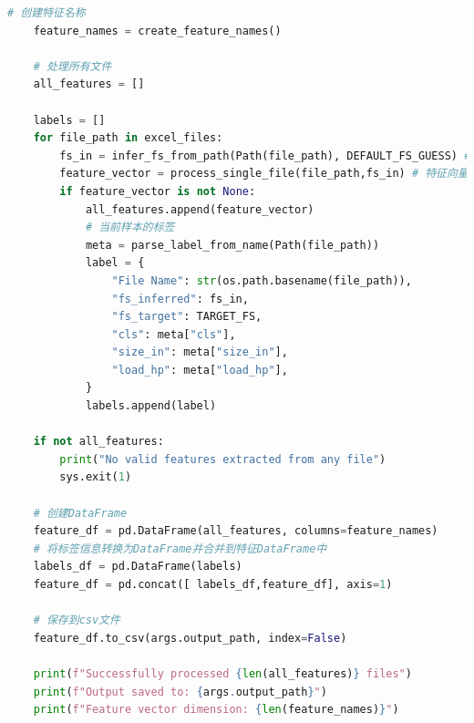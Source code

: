 \documentclass[a4paper]{CPIPC}
\numberwithin{equation}{section}
\begin{document}
\begin{lstlisting}[language=Python, caption=Feature Extraction]
    # 创建特征名称
    feature_names = create_feature_names()
    
    # 处理所有文件
    all_features = []

    labels = []
    for file_path in excel_files:
        fs_in = infer_fs_from_path(Path(file_path), DEFAULT_FS_GUESS) # 输入频率
        feature_vector = process_single_file(file_path,fs_in) # 特征向量
        if feature_vector is not None:
            all_features.append(feature_vector)
            # 当前样本的标签
            meta = parse_label_from_name(Path(file_path))
            label = {
                "File Name": str(os.path.basename(file_path)),
                "fs_inferred": fs_in,
                "fs_target": TARGET_FS,
                "cls": meta["cls"],
                "size_in": meta["size_in"],
                "load_hp": meta["load_hp"],
            }
            labels.append(label)
    
    if not all_features:
        print("No valid features extracted from any file")
        sys.exit(1)
    
    # 创建DataFrame
    feature_df = pd.DataFrame(all_features, columns=feature_names)
    # 将标签信息转换为DataFrame并合并到特征DataFrame中
    labels_df = pd.DataFrame(labels)
    feature_df = pd.concat([ labels_df,feature_df], axis=1)
    
    # 保存到csv文件
    feature_df.to_csv(args.output_path, index=False)
    
    print(f"Successfully processed {len(all_features)} files")
    print(f"Output saved to: {args.output_path}")
    print(f"Feature vector dimension: {len(feature_names)}")
\end{lstlisting}
\end{document}
